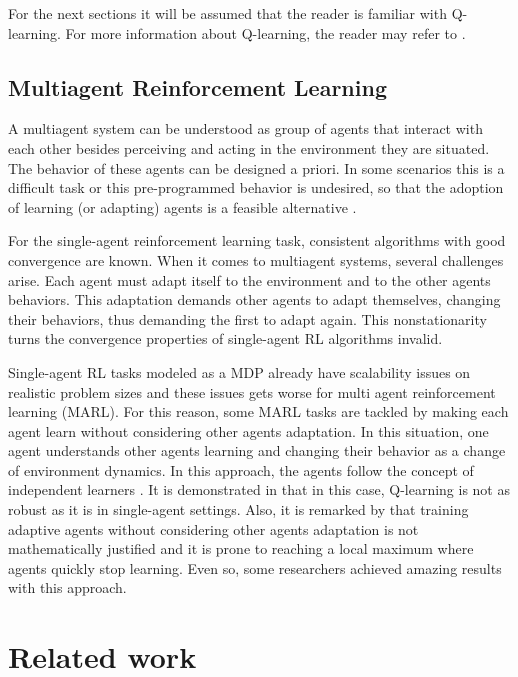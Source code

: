 \documentclass[12pt]{article}
\begin{document}
For the next sections it will be assumed that the reader is familiar with Q-learning. For more information about Q-learning, the reader may refer to \cite{Watkins&Dayan1992}.

\subsection{Multiagent Reinforcement Learning}
A multiagent system can be understood as group of agents that interact with each other besides perceiving and acting in the environment they are situated. The behavior of these agents can be designed a priori. In some scenarios this is a difficult task or this pre-programmed behavior is undesired, so that the adoption of learning (or adapting) agents is a feasible alternative \cite{Busoniu+2008}.

For the single-agent reinforcement learning task, consistent algorithms with good convergence are known. When it comes to multiagent systems, several challenges arise. Each agent must adapt itself to the environment and to the other agents behaviors. This adaptation demands other agents to adapt themselves, changing their behaviors, thus demanding the first to adapt again. This nonstationarity turns the convergence properties of single-agent RL algorithms invalid.

Single-agent RL tasks modeled as a MDP already have scalability issues on realistic problem sizes and these issues gets worse for multi agent reinforcement learning (MARL). For this reason, some MARL tasks are tackled by making each agent learn without considering other agents adaptation. In this situation, one agent understands other agents learning and changing their behavior as a change of environment dynamics. In this approach, the agents follow the concept of independent learners \cite{Claus&Boutilier1998}. It is demonstrated in \cite{Claus&Boutilier1998} that in this case, Q-learning is not as robust as it is in single-agent settings. Also, it is remarked by \cite{Littman1994} that training adaptive agents without considering other agents adaptation is not mathematically justified and it is prone to reaching a local maximum where agents quickly stop learning. Even so, some researchers achieved amazing results with this approach.

\section{Related work}
\label{sec:related}
\end{document}
